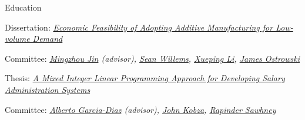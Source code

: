 \begin{rubric}{Education}
	\par Dissertation: \href{https://trace.tennessee.edu/cgi/viewcontent.cgi?params=/context/utk_graddiss/article/7685/&path_info=utk.ir.td_13642.pdf}{\emph{Economic Feasibility of Adopting Additive Manufacturing for Low-volume Demand}}
        \par Committee: \emph{\href{https://tickle.utk.edu/ise/faculty/mingzhou-jin/}{Mingzhou Jin} (advisor), \href{https://haslam.utk.edu/people/profile/sean-willems/}{Sean Willems}, \href{https://tickle.utk.edu/ise/faculty/xueping-li/}{Xueping Li}, \href{https://tickle.utk.edu/ise/faculty/james-ostrowski/}{James Ostrowski}}
%
 \par
	Thesis: \href{https://trace.tennessee.edu/cgi/viewcontent.cgi?article=5503&context=utk_gradthes&httpsredir=1}{\emph{A Mixed Integer Linear Programming Approach for Developing Salary Administration Systems}}
    \par Committee: \emph{\href{https://tickle.utk.edu/ise/faculty/emeritus-faculty/alberto-garcia-diaz/}{Alberto Garcia-Diaz} (advisor), \href{https://experts.utk.edu/experts/john-kobza/}{John Kobza}, \href{https://tickle.utk.edu/ise/remembering-rupy-sawhney/}{Rapinder Sawhney}}
\vspace{5pt}
\vspace{5pt}
\end{rubric}